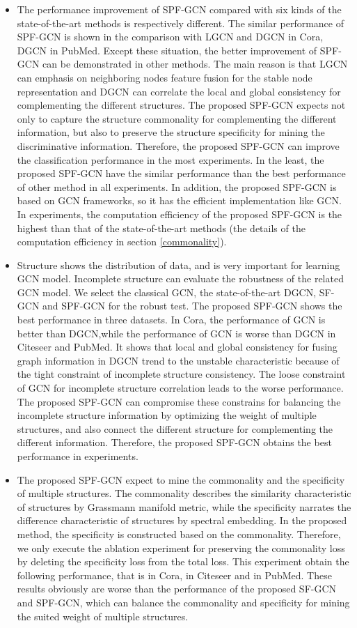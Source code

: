 \documentclass[review]{elsarticle}
\begin{document}
\begin{itemize}
\item The performance improvement of SPF-GCN compared with six kinds of the state-of-the-art methods is respectively different. The similar performance of SPF-GCN is shown in the comparison with LGCN and DGCN in Cora, DGCN in PubMed. Except these situation, the better improvement of SPF-GCN can be demonstrated in other methods. The main reason is that LGCN can emphasis on  neighboring nodes feature fusion for the stable node representation and DGCN can correlate the local and global consistency for complementing the different structures. The proposed SPF-GCN expects not only to capture the structure commonality for complementing the different information, but also to preserve the structure specificity for mining the discriminative information. Therefore, the proposed SPF-GCN can improve the classification performance in the most experiments. In the least, the proposed SPF-GCN have the similar performance than the best performance of other method in all experiments. In addition, the proposed SPF-GCN is based on GCN frameworks, so it has the efficient implementation like GCN. In experiments, the computation efficiency of the proposed SPF-GCN is the highest than that of the state-of-the-art methods (the details of the computation efficiency in section \ref{commonality}).
\item Structure shows the distribution of data, and is very important for learning GCN model. Incomplete structure can evaluate the robustness of the related GCN model. We select the classical GCN, the state-of-the-art DGCN, SF-GCN and SPF-GCN for the robust test. The proposed SPF-GCN shows the best performance in three datasets. In Cora, the performance of GCN is better than DGCN,while the performance of GCN is worse than DGCN in Citeseer and PubMed. It shows that local and global consistency for fusing graph information in DGCN trend to the unstable characteristic because of the tight constraint of incomplete structure consistency. The loose constraint of GCN for incomplete structure correlation leads to the worse performance. The proposed SPF-GCN can compromise these constrains for balancing the incomplete structure information by optimizing the weight of multiple structures, and also connect the different structure for complementing the different information. Therefore, the proposed SPF-GCN obtains the best performance in experiments.
\item The proposed SPF-GCN expect to mine the commonality and the specificity of multiple structures. The commonality describes the similarity characteristic of structures by Grassmann manifold metric, while the specificity narrates the difference characteristic of structures by spectral embedding. In the proposed method, the specificity is constructed based on the commonality. Therefore, we only execute the ablation experiment for preserving the commonality loss by deleting the specificity loss from the total loss. This experiment obtain the following performance, that is  in Cora,  in Citeseer and  in PubMed. These results obviously are worse than the performance of the proposed SF-GCN and SPF-GCN, which can balance the commonality and specificity for mining the suited weight of multiple structures.



\end{itemize}
\end{document}

